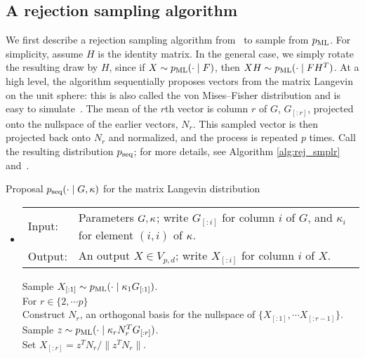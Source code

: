 \subsection{A rejection  sampling algorithm} \label{sec:prior_sim}
We first describe a rejection sampling algorithm from~\cite{hoff2009} to sample from $\ml$.
For simplicity, assume $H$ is the identity matrix. In the general case, we simply rotate  the resulting draw 
by $H$, since if $X \sim \ml(\cdot\mid F)$, then $XH \sim \ml(\cdot\mid FH^T)$.
At a high level, the algorithm sequentially proposes vectors
from the matrix Langevin on the unit sphere: this is also called the von Mises--Fisher distribution and is easy to simulate~\citep{wood1994}.
The mean of the $r${th} vector is column $r$ of $G$, $G_{[:r]}$, projected onto the nullspace of the earlier vectors, $N_r$.
This sampled vector is then projected back onto $N_r$ and normalized, and %
the process is repeated $p$ times. Call the resulting
distribution $\seq$; for more details, see Algorithm \ref{alg:rej_smplr} and~\cite{hoff2009}.
{
\vspace{.1in}
\begin{algo}{Proposal $\seq(\cdot\mid G, \bkappa)$ for the matrix Langevin distribution~\citep{hoff2009}}\label{alg:rej_smplr}
  \begin{itemize}
    \item[]
\begin{tabular}{p{.9cm}p{12.2cm}}
{Input:}  & Parameters $G,\kappa$; write $G_{[:i]}$ for column $i$ of $G$, and $\kappa_i$ for element $(i,i)$ of $\kappa$. \\
{Output:} & An output  $X \in V_{p,d}$; write $X_{[:i]}$ for column $i$ of $X$. \\
\end{tabular}
\begin{tabbing}
  \enspace Sample $X_{[:1]} \sim \ml(\cdot\mid \kappa_1 G_{[:1]})$. \\
  \enspace For $r \in \{2,\cdots p\}$\\
    \qquad Construct $N_r$, an orthogonal basis for the nullspace of $\{X_{[:1]},\cdots X_{[:r-1]} \}$.\\
    \qquad Sample $z \sim \ml(\cdot\mid \kappa_r N^T_r G_{[:r]})$. \\
    \qquad Set $X_{[:r]} = z^T N_r/ \|z^T N_r\|. $
\end{tabbing}
  \end{itemize}
\end{algo}
}
